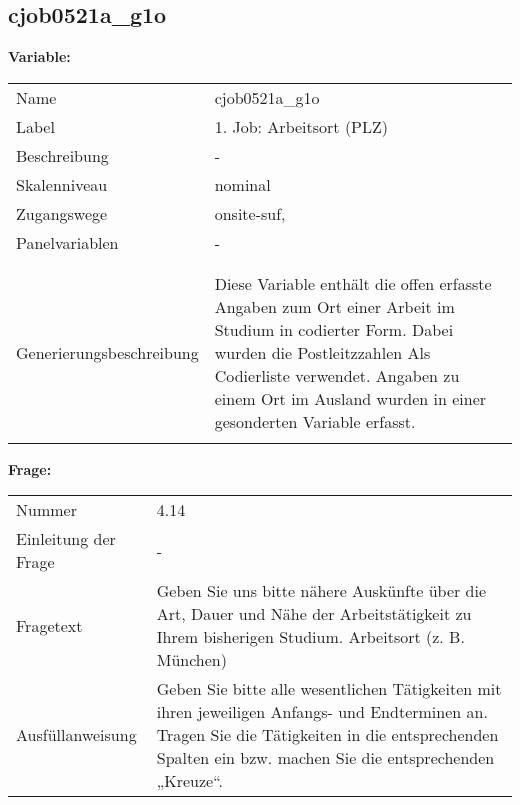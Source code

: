 	
	
	\subsection{cjob0521a\_g1o}
	\label{subSection:cjob0521a_g1o}

	\noindent\textbf{Variable:}\\
		\begin{tabular}{lL{11.3cm}}
			\label{tableVariable:cjob0521a_g1o}
			Name & cjob0521a\_g1o \\
			Label & 1. Job: Arbeitsort (PLZ) \\
			Beschreibung & - \\
			Skalenniveau & nominal \\
			Zugangswege &
				onsite-suf,
 \\
			Panelvariablen & -
			 \\
			 \\
 \\
					Generierungsbeschreibung & Diese Variable enthält die offen erfasste Angaben zum Ort einer Arbeit im Studium in codierter Form. Dabei wurden die Postleitzzahlen Als Codierliste verwendet. Angaben zu einem Ort im Ausland wurden in einer gesonderten Variable erfasst. 
				 \\	
			 \\
		\end{tabular}

		\vspace*{1 cm}
		\noindent\textbf{Frage:}\\
		\begin{tabular}{lL{11.3cm}}
			\label{tableQuestion:cjob0521a_g1o}
			Nummer & 4.14 \\
			Einleitung der Frage & - \\
			Fragetext & Geben Sie uns bitte nähere Auskünfte über die Art, Dauer und Nähe der Arbeitstätigkeit zu Ihrem bisherigen Studium.
Arbeitsort
(z. B. München) \\
			Ausfüllanweisung & Geben Sie bitte alle wesentlichen Tätigkeiten mit ihren jeweiligen Anfangs- und Endterminen an. Tragen Sie die Tätigkeiten in die entsprechenden Spalten ein bzw. machen Sie die entsprechenden „Kreuze“. \\
		\end{tabular}





